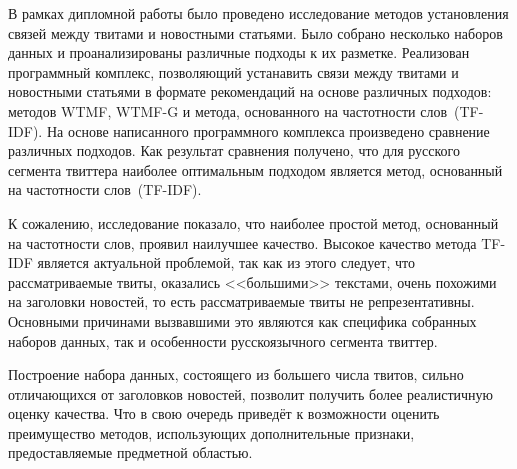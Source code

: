 \conclusiontitle
    В рамках дипломной работы было проведено исследование методов установления связей между твитами и новостными статьями.
    Было собрано несколько наборов данных и проанализированы различные подходы к их разметке.
    Реализован программный комплекс, позволяющий устанавить связи между твитами и новостными статьями в формате рекомендаций на основе различных подходов:
    методов WTMF, WTMF-G и метода, основанного на частотности слов~(TF-IDF).
    На основе написанного программного комплекса произведено сравнение различных подходов.
    Как результат сравнения получено, что для русского сегмента твиттера наиболее оптимальным подходом является метод, основанный на частотности слов~(TF-IDF).

    К сожалению, исследование показало, что наиболее простой метод, основанный на частотности слов, проявил наилучшее качество.
    Высокое качество метода TF-IDF является актуальной проблемой, так как из этого следует, что рассматриваемые твиты,
    оказались <<большими>> текстами, очень похожими на заголовки новостей, то есть рассматриваемые твиты не репрезентативны.
    Основными причинами вызвавшими это являются как специфика собранных наборов данных, так и особенности русскоязычного сегмента твиттер.

    Построение набора данных, состоящего из большего числа твитов, сильно отличающихся от заголовков новостей, позволит
    получить более реалистичную оценку качества. Что в свою очередь приведёт к возможности оценить преимущество методов,
    использующих дополнительные признаки, предоставляемые предметной областью.
    